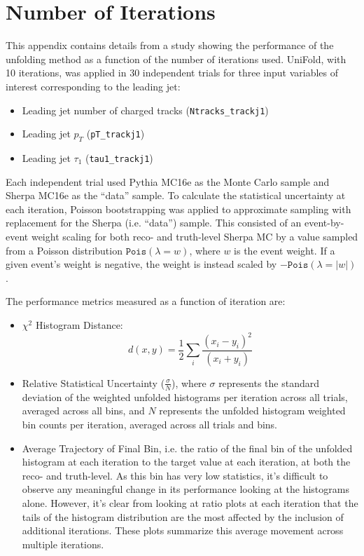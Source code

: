 \section{Number of Iterations}
\label{sec:num_iterations}

This appendix contains details from a study showing the performance of the unfolding method as a function of the number of iterations used. UniFold, with 10 iterations, was applied in 30 independent trials for three input variables of interest corresponding to the leading jet: 

\begin{itemize}
\item Leading jet number of charged tracks (\texttt{Ntracks\_trackj1})
\item Leading jet $p_T$ (\texttt{pT\_trackj1})
\item Leading jet $\tau_1$ (\texttt{tau1\_trackj1})
\end{itemize}

Each independent trial used Pythia MC16e as the Monte Carlo sample and Sherpa MC16e as the ``data'' sample. To calculate the statistical uncertainty at each iteration, Poisson bootstrapping was applied to approximate sampling with replacement for the Sherpa (i.e. ``data'') sample. This consisted of an event-by-event weight scaling for both reco- and truth-level Sherpa MC by a value sampled from a Poisson distribution $\texttt{Pois}(\lambda = w)$, where $w$ is the event weight. If a given event's weight is negative, the weight is instead scaled by $-\texttt{Pois}(\lambda = |w|)$.

The performance metrics measured as a function of iteration are: 
\begin{itemize}
\item $\chi^2$ Histogram Distance: $$d(x,y) = \frac{1}{2}\sum_i\frac{(x_i - y_i)^2}{(x_i + y_i)}$$
\item Relative Statistical Uncertainty ($\frac{\sigma}{N}$), where $\sigma$ represents the standard deviation of the weighted unfolded histograms per iteration across all trials, averaged across all bins, and $N$ represents the unfolded histogram weighted bin counts per iteration, averaged across all trials and bins. 
\item Average Trajectory of Final Bin, i.e. the ratio of the final bin of the unfolded histogram at each iteration to the target value at each iteration, at both the reco- and truth-level. As this bin has very low statistics, it's difficult to observe any meaningful change in its performance looking at the histograms alone. However, it's clear from looking at ratio plots at each iteration that the tails of the histogram distribution are the most affected by the inclusion of additional iterations. These plots summarize this average movement across multiple iterations.
\end{itemize}

